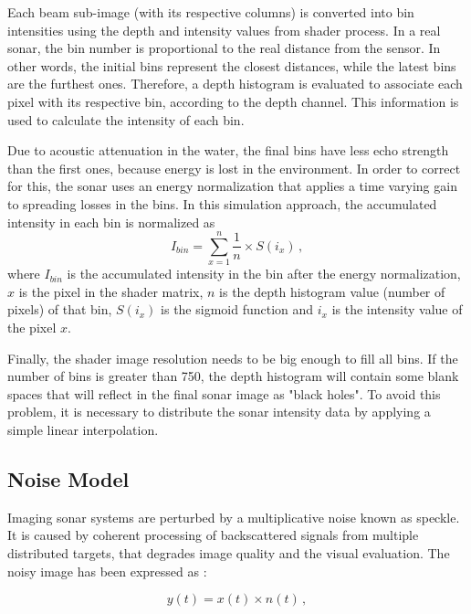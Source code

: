 \documentclass[final,5p,times]{elsarticle}
\begin{document}
Each beam sub-image (with its respective columns) is converted into bin intensities using the depth and intensity values from shader process. In a real sonar, the bin number is proportional to the real distance from the sensor. In other words, the initial bins represent the closest distances, while the latest bins are the furthest ones. Therefore, a depth histogram is evaluated to associate each pixel with its respective bin, according to the depth channel. This information is used to calculate the intensity of each bin.

Due to acoustic attenuation in the water, the final bins have less echo strength than the first ones, because energy is lost in the environment. In order to correct for this, the sonar uses an energy normalization that applies a time varying gain to spreading losses in the bins. In this simulation approach, the accumulated intensity in each bin is normalized as
\begin{equation}
    \label{eq:1}
    I_{bin} = \sum\limits_{x=1}^n \frac{1}{n} \times S(i_{x}) \, ,
\end{equation}
where $I_{bin}$ is the accumulated intensity in the bin after the energy normalization, $x$ is the pixel in the shader matrix, $n$ is the depth histogram value (number of pixels) of that bin, $S(i_{x})$ is the sigmoid function and $i_{x}$ is the intensity value of the pixel $x$.

Finally, the shader image resolution needs to be big enough to fill all bins. If the number of bins is greater than 750, the depth histogram will contain some blank spaces that will reflect in the final sonar image as "black holes". To avoid this problem, it is necessary to distribute the sonar intensity data by applying a simple linear interpolation.

\subsection{Noise Model}
\label{dev:noise}

Imaging sonar systems are perturbed by a multiplicative noise known as speckle. It is caused by coherent processing of backscattered signals from multiple distributed targets, that degrades image quality and the visual evaluation. The noisy image has been expressed as \cite{lee1980}:

\begin{equation}
\label{eq:2}
y(t) = x(t) \times n(t) \, ,
\end{equation}
\end{document}
